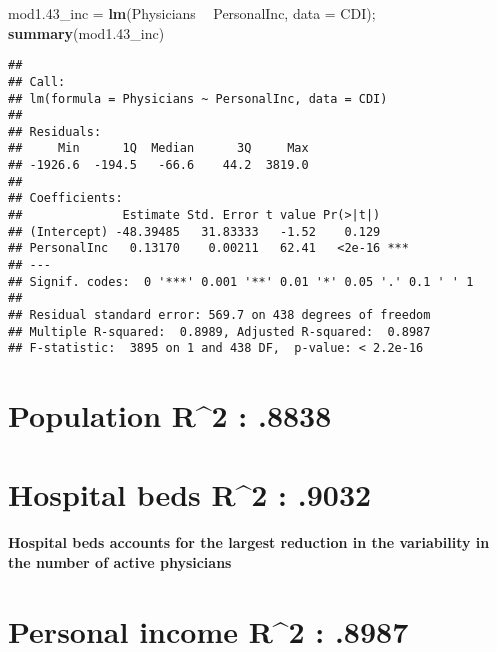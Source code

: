 \documentclass[]{article}
\newenvironment{Shaded}{\begin{snugshade}}{\end{snugshade}}
\newcommand{\DataTypeTok}[1]{\textcolor[rgb]{0.13,0.29,0.53}{#1}}
\newcommand{\FloatTok}[1]{\textcolor[rgb]{0.00,0.00,0.81}{#1}}
\newcommand{\KeywordTok}[1]{\textcolor[rgb]{0.13,0.29,0.53}{\textbf{#1}}}
\newcommand{\NormalTok}[1]{#1}
\newcommand{\OperatorTok}[1]{\textcolor[rgb]{0.81,0.36,0.00}{\textbf{#1}}}
\newcommand{\StringTok}[1]{\textcolor[rgb]{0.31,0.60,0.02}{#1}}
\let\oldparagraph\paragraph
\renewcommand{\paragraph}[1]{\oldparagraph{#1}\mbox{}}
\begin{document}
\begin{Shaded}
\begin{Highlighting}[]
\NormalTok{mod1}\FloatTok{.43}\NormalTok{_inc =}\StringTok{ }\KeywordTok{lm}\NormalTok{(Physicians }\OperatorTok{~}\StringTok{ }\NormalTok{PersonalInc, }\DataTypeTok{data =}\NormalTok{ CDI); }\KeywordTok{summary}\NormalTok{(mod1}\FloatTok{.43}\NormalTok{_inc)}
\end{Highlighting}
\end{Shaded}

\begin{verbatim}
## 
## Call:
## lm(formula = Physicians ~ PersonalInc, data = CDI)
## 
## Residuals:
##     Min      1Q  Median      3Q     Max 
## -1926.6  -194.5   -66.6    44.2  3819.0 
## 
## Coefficients:
##              Estimate Std. Error t value Pr(>|t|)    
## (Intercept) -48.39485   31.83333   -1.52    0.129    
## PersonalInc   0.13170    0.00211   62.41   <2e-16 ***
## ---
## Signif. codes:  0 '***' 0.001 '**' 0.01 '*' 0.05 '.' 0.1 ' ' 1
## 
## Residual standard error: 569.7 on 438 degrees of freedom
## Multiple R-squared:  0.8989, Adjusted R-squared:  0.8987 
## F-statistic:  3895 on 1 and 438 DF,  p-value: < 2.2e-16
\end{verbatim}

\hypertarget{population-r2-.8838}{%
\section{Population R\^{}2 : .8838}\label{population-r2-.8838}}

\hypertarget{hospital-beds-r2-.9032}{%
\section{Hospital beds R\^{}2 : .9032}\label{hospital-beds-r2-.9032}}

\hypertarget{hospital-beds-accounts-for-the-largest-reduction-in-the-variability-in-the-number-of-active-physicians}{%
\paragraph{Hospital beds accounts for the largest reduction in the
variability in the number of active
physicians}\label{hospital-beds-accounts-for-the-largest-reduction-in-the-variability-in-the-number-of-active-physicians}}

\hypertarget{personal-income-r2-.8987}{%
\section{Personal income R\^{}2 :
.8987}\label{personal-income-r2-.8987}}
\end{document}
